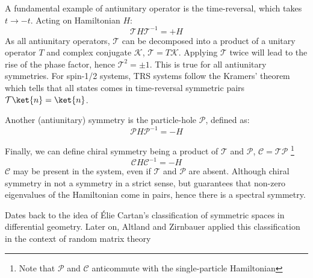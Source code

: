 A fundamental example of antiunitary operator is the time-reversal, which takes $t \rightarrow -t$. Acting on Hamiltonian $H$:
\begin{equation}
\mathcal{T}  H \mathcal{T}^{-1} = + H
\end{equation}
As all antiunitary operators, $\mathcal{T}$ can be decomposed into a product of a unitary operator $T$ and complex conjugate $\mathcal{K}$, $\mathcal{T} = T \mathcal{K}$. Applying $\mathcal{T}$ twice will lead to the rise of the phase factor, hence $\mathcal{T}^2 = \pm 1$. This is true for all antiunitary symmetries. For spin-1/2 systems, TRS systems follow the Kramers' theorem which tells that all states comes in time-reversal symmetric pairs $\mathcal{T} \ket{n} = \ket{n}$.

Another (antiunitary) symmetry is the particle-hole $\mathcal{P}$, defined as:
\begin{equation}
\mathcal{P}  H \mathcal{P}^{-1} = - H
\end{equation}

Finally, we can define chiral symmetry being a product of $\mathcal{T}$ and $\mathcal{P}$, $\mathcal{C}= \mathcal{TP}$ \footnote{Note that $\mathcal{P}$ and $\mathcal{C}$ anticommute with the single-particle Hamiltonian}
\begin{equation}
\mathcal{C}  H \mathcal{C}^{-1} = - H
\end{equation}
$\mathcal{C}$ may be present in the system, even if $\mathcal{T}$ and $\mathcal{P}$ are absent. Although chiral symmetry in not a symmetry in a strict sense, but guarantees that non-zero eigenvalues of the Hamiltonian come in pairs, hence there is a spectral symmetry.




Dates back to the idea of \'{E}lie Cartan's classification of symmetric spaces in differential geometry. Later on, Altland and Zirnbauer applied this classification in the context of random matrix theory~\cite{AltlandZirnbauer1997}




